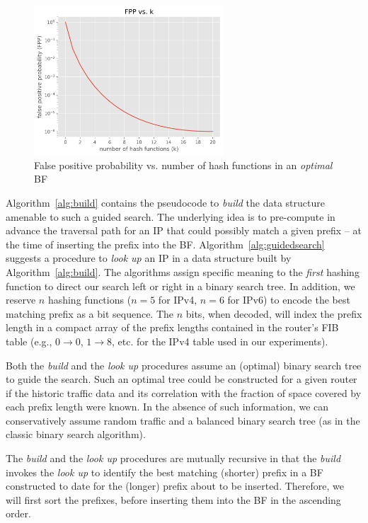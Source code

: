 \documentclass[conference,compsoc]{IEEEtran}
\begin{document}
\begin{figure}[h]
\centering
\includegraphics[height=2.2in]{../img/PvsK.png}
  \caption{False positive probability vs. number of hash functions in an \emph{optimal} BF}
\label{fig:fpp}
\end{figure}


Algorithm~\ref{alg:build} contains the pseudocode to \emph{build} the data 
structure amenable to such a guided search. The underlying idea is to
pre-compute in advance the traversal path for an IP that could possibly match a given
prefix -- at the time of inserting the prefix into the BF.
Algorithm~\ref{alg:guidedsearch} suggests
a procedure to \emph{look up} an IP in a data structure built by
Algorithm~\ref{alg:build}. The
algorithms assign specific meaning to the \emph{first} hashing function
to direct our search left or right in a binary search tree. In addition, we
reserve $n$ hashing functions ($n=5$ for IPv4, $n=6$ for IPv6) to encode
the best matching prefix as a bit sequence. The $n$ bits, when decoded,
will index the prefix length in a compact array of the prefix lengths
contained in the router's FIB table (e.g., $0 \rightarrow 0$, $1 \rightarrow 8$, etc.
for the IPv4 table used in our experiments).

Both the \emph{build} and the \emph{look up} procedures assume an (optimal)
binary search tree to guide the search. Such an optimal tree could be
constructed for a given router if the historic traffic data and its 
correlation with the fraction of space covered by each prefix length
were known. In the absence of such information, we can conservatively
assume random traffic and a balanced binary search tree (as in the
classic binary search algorithm).

The \emph{build} and the \emph{look up} procedures are mutually recursive
in that the \emph{build} invokes the \emph{look up} to identify the
best matching (shorter) prefix in a BF constructed to date for the (longer) prefix 
about to be inserted. Therefore, we will first sort the prefixes, before inserting them 
into the BF in the ascending order.
\end{document}
